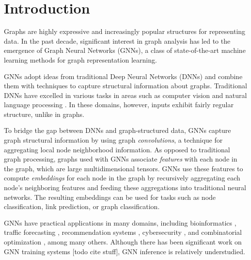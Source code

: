 \chapter{Introduction}


Graphs are highly expressive and increasingly popular structures for representing data.
In the past decade, significant interest in graph analysis has led to the emergence of Graph Neural Networks (GNNs), a class of state-of-the-art machine learning methods for graph representation learning. 

GNNs adopt ideas from traditional Deep Neural Networks (DNNs) and combine them with techniques to capture structural information about graphs. Traditional DNNs have excelled in various tasks in areas such as computer vision \cite{AlexNet_2012}\cite{YOLO_2016} and natural language processing \cite{RNN_2013}\cite{NamedEntityRecognition_2016}. In these domains, however, inputs exhibit fairly regular structure, unlike in graphs. 

To bridge the gap between DNNs and graph-structured data, GNNs capture graph structural information by using graph \textit{convolutions}, a technique for aggregating local node neighborhood information. As opposed to traditional graph processing, graphs used with GNNs associate \textit{features} with each node in the graph, which are large multidimensional tensors. GNNs use these features to compute \textit{embeddings} for each node in the graph by recursively aggregating each node's neighboring features and feeding these aggregations into traditional neural networks. 
The resulting embeddings can be used for tasks such as node classification, link prediction, or graph classification.

GNNs have practical applications in many domains, including bioinformatics \cite{Bioinfo_2021} \cite{Bioinfo_2022}, 
traffic forecasting \cite{Traffic_SST-GNN_2021} \cite{Traffic_GoogleMaps_2021} \cite{Traffic_survey_2021}, recommendation systems \cite{Recsys_PinSAGE_2018} \cite{Recsys_Diffnet_2022}\cite{Recsys_LightGCN_2020}\cite{Recsys_NAGCN_2020}\cite{Recsys_SGL_2021}\cite{Recsys_Survey_2022}, 
cybersecurity \cite{Cybersec_2022} \cite{Cybersec_2023}, and combinatorial optimization \cite{CombinatorialOptimization_2019}\cite{CombinatorialOptimization_2021}, among many others. Although there has been significant work on GNN training systems [todo cite stuff], GNN inference is relatively understudied. 

